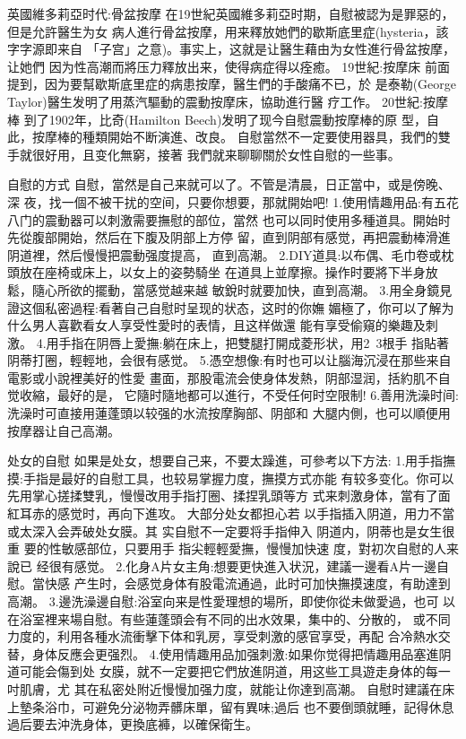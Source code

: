 \documentclass[12pt,UTF8]{ctexbook}
\begin{document}
英國維多莉亞时代:骨盆按摩
在19世紀英國維多莉亞时期，自慰被認为是罪惡的，但是允許醫生为女
病人進行骨盆按摩，用来釋放她們的歇斯底里症(hysteria，該字字源即来自
「子宫」之意)。事实上，这就是让醫生藉由为女性進行骨盆按摩，让她們
因为性高潮而將压力釋放出来，使得病症得以痊癒。
19世紀:按摩床
前面提到，因为要幫歇斯底里症的病患按摩，醫生們的手酸痛不已，於
是泰勒(George Taylor)醫生发明了用蒸汽驅動的震動按摩床，協助進行醫
疗工作。
20世紀:按摩棒
到了1902年，比奇(Hamilton Beech)发明了现今自慰震動按摩棒的原
型，自此，按摩棒的種類開始不断演進、改良。
自慰當然不一定要使用器具，我們的雙手就很好用，且变化無窮，接著
我們就来聊聊關於女性自慰的一些事。

自慰的方式
自慰，當然是自己来就可以了。不管是清晨，日正當中，或是傍晚、深
夜，找一個不被干扰的空间，只要你想要，那就開始吧!
1.使用情趣用品:有五花八门的震動器可以刺激需要撫慰的部位，當然
也可以同时使用多種道具。開始时先從腹部開始，然后在下腹及阴部上方停
留，直到阴部有感觉，再把震動棒滑進阴道裡，然后慢慢把震動强度提高，
直到高潮。
2.DIY道具:以布偶、毛巾卷或枕頭放在座椅或床上，以女上的姿勢騎坐
在道具上並摩擦。操作时要將下半身放鬆，隨心所欲的擺動，當感觉越来越
敏銳时就要加快，直到高潮。
3.用全身鏡見證这個私密過程:看著自己自慰时呈现的状态，这时的你嫵
媚極了，你可以了解为什么男人喜歡看女人享受性愛时的表情，且这样做還
能有享受偷窺的樂趣及刺激。
4.用手指在阴唇上愛撫:躺在床上，把雙腿打開成菱形状，用2~3根手
指貼著阴蒂打圈，輕輕地，会很有感觉。
5.憑空想像:有时也可以让腦海沉浸在那些来自電影或小說裡美好的性愛
畫面，那股電流会使身体发熱，阴部湿润，括約肌不自觉收縮，最好的是，
它隨时隨地都可以進行，不受任何时空限制!
6.善用洗澡时间:洗澡时可直接用蓮蓬頭以较强的水流按摩胸部、阴部和
大腿内側，也可以順便用按摩器让自己高潮。

处女的自慰
如果是处女，想要自己来，不要太躁進，可參考以下方法:
1.用手指撫摸:手指是最好的自慰工具，也较易掌握力度，撫摸方式亦能
有较多变化。你可以先用掌心搓揉雙乳，慢慢改用手指打圈、揉捏乳頭等方
式来刺激身体，當有了面紅耳赤的感觉时，再向下進攻。
大部分处女都担心若
以手指插入阴道，用力不當
或太深入会弄破处女膜。其
实自慰不一定要将手指伸入
阴道内，阴蒂也是女生很重
要的性敏感部位，只要用手
指尖輕輕愛撫，慢慢加快速
度，對初次自慰的人来說已
经很有感觉。
2.化身A片女主角:想要更快進入状況，建議一邊看A片一邊自慰。當快感
产生时，会感觉身体有股電流通過，此时可加快撫摸速度，有助達到高潮。
3.邊洗澡邊自慰:浴室向来是性愛理想的場所，即使你從未做愛過，也可
以在浴室裡来場自慰。有些蓮蓬頭会有不同的出水效果，集中的、分散的，
或不同力度的，利用各種水流衝擊下体和乳房，享受刺激的感官享受，再配
合冷熱水交替，身体反應会更强烈。
4.使用情趣用品加强刺激:如果你觉得把情趣用品塞進阴道可能会傷到处
女膜，就不一定要把它們放進阴道，用这些工具遊走身体的每一吋肌膚，尤
其在私密处附近慢慢加强力度，就能让你達到高潮。
自慰时建議在床上墊条浴巾，可避免分泌物弄髒床單，留有異味;過后
也不要倒頭就睡，記得休息過后要去沖洗身体，更換底褲，以確保衛生。
\end{document}
